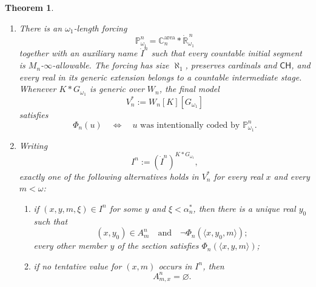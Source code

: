 \documentclass[a4paper,11pt]{article}
\newtheorem{theorem}{Theorem}[section]
\newcommand{\forceP}{\mathbb{P}}
\newcommand{\forceR}{\mathbb{R}}
\newcommand{\forceC}{\mathbb{C}}
\newcommand{\CH}{\mathsf{CH}}
\begin{document}
\begin{theorem}
\begin{enumerate}
   \item There is an $\omega_1$-length forcing
         \[
            \forceP^n_{\omega_1}
            =\forceC^{\mathrm{area}}_n*
               \dot{\forceR}^{\,n}_{\omega_1}
         \]
         together with an auxiliary name $\dot I^n$ such that every countable
         initial segment is $M_n$-$\infty$-allowable.  The forcing has size
         $\aleph_1$, preserves cardinals and $\CH$, and every real in
         its generic extension belongs to a countable intermediate stage.
         Whenever $K*G_{\omega_1}$ is generic over $W_n$, the final model
         \[
            V_n^\ast:=W_n[K][G_{\omega_1}]
         \]
         satisfies
         \[
            \Phi_n(u)
            \quad\Longleftrightarrow\quad
            u\text{ was intentionally coded by }
            \forceP^n_{\omega_1}.
         \]

   \item Writing
         \[
            I^n:=(\dot I^n)^{K*G_{\omega_1}},
         \]
         exactly one of the following alternatives holds in $V_n^\ast$ for
         every real $x$ and every $m<\omega$:
         \begin{enumerate}
            \item if $(x,y,m,\xi)\in I^n$ for some $y$ and
                  $\xi<\alpha_n^\ast$, then there is a unique real $y_0$
                  such that
                  \[
                     (x,y_0)\in A^n_m
                     \quad\text{and}\quad
                     \neg\Phi_n(\langle x,y_0,m\rangle);
                  \]
                  every other member $y$ of the section satisfies
                  $\Phi_n(\langle x,y,m\rangle)$;

            \item if no tentative value for $(x,m)$ occurs in $I^n$, then
                  \[
                     A^n_{m,x}=\varnothing.
                  \]
         \end{enumerate}
\end{enumerate}
\end{theorem}
\end{document}
